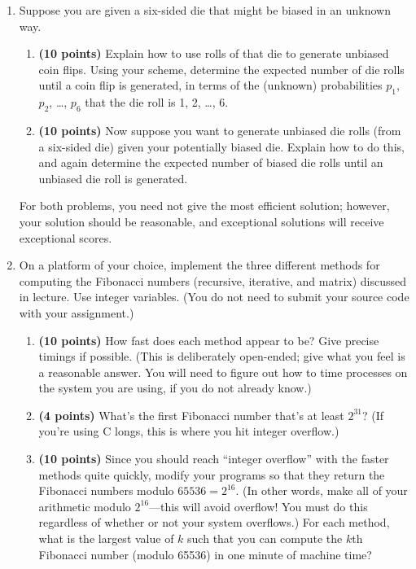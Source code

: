 \documentclass[11pt]{article}
\begin{document}
\begin{enumerate}
\item
Suppose you are given a six-sided die that might be biased in an unknown way. 
\begin{enumerate}
\item
{\bf (10 points)}
Explain how to use rolls of that die to generate unbiased coin flips. Using your scheme, determine
the expected number of die rolls until a coin flip is generated, in terms of the (unknown) probabilities
$p_1$, $p_2$, \ldots, $p_6$ that the die roll is 1, 2, \ldots, 6.
\item 
{\bf (10 points)}
Now suppose you want to generate unbiased die rolls (from a six-sided die) given
your potentially biased die. Explain how to do this, and again determine the expected number of
biased die rolls until an unbiased die roll is generated. 
\end{enumerate}
For both problems, you need not give the
most efficient solution; however, your solution should be reasonable, and exceptional solutions will
receive exceptional scores.
\item
On a platform of your choice, implement the three different methods for computing the Fibonacci
numbers (recursive, iterative, and matrix) discussed in lecture. Use integer variables. (You do not need to submit your source code with your assignment.)
\begin{enumerate}
\item
{\bf (10 points)}
How fast does
each method appear to be? Give precise timings if possible. (This is deliberately open-ended; give
what you feel is a reasonable answer. You will need to figure out how to time processes on the system
you are using, if you do not already know.) 
\item
{\bf (4 points)}
What's the first Fibonacci number that's at least $2^{31}$? (If you're using C longs, this is where you hit
integer overflow.)
\item
{\bf (10 points)}
Since you should reach ``integer overflow'' with the faster methods quite quickly, modify your programs
so that they return the Fibonacci numbers modulo $65536 = 2^{16}$. (In other words, make all of your
arithmetic modulo $2^{16}$---this will avoid overflow! You must do this regardless of whether or not your
system overflows.) For each method, what is the largest value of $k$ such that you can compute the
$k$th Fibonacci number (modulo 65536) in one minute of machine time?
\end{enumerate}


\end{enumerate}
\end{document}
